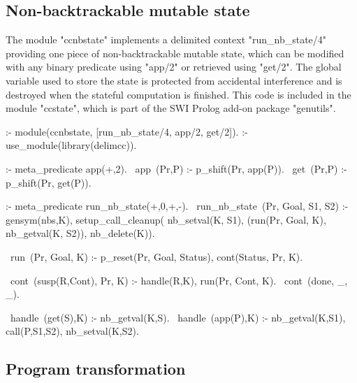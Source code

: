 
\subsection{Non-backtrackable mutable state}
\label{app:ccnbstate}

The module "ccnbstate" implements a delimited context "run_nb_state/4"
providing one piece of non-backtrackable mutable state, which can be modified with any binary predicate
using "app/2" or retrieved using "get/2". The global variable used to store the state
is protected from accidental interference and is destroyed when the stateful
computation is finished. This code is included in the module "ccstate", which 
is part of the SWI Prolog add-on package "genutils".
\begin{prolog-framed}[name=ccnbstate]
  :- module(ccnbstate, [run_nb_state/4, app/2, get/2]).
  :- use_module(library(delimcc)).

  :- meta_predicate app(+,2).
  ~app~(Pr,P) :- p_shift(Pr, app(P)).
  ~get~(Pr,P) :- p_shift(Pr, get(P)).

  :- meta_predicate run_nb_state(+,0,+,-).
  ~run_nb_state~(Pr, Goal, S1, S2) :-
     gensym(nbs,K),
     setup_call_cleanup( nb_setval(K, S1),
                         (run(Pr, Goal, K), nb_getval(K, S2)),
                         nb_delete(K)).

  ~run~(Pr, Goal, K) :- p_reset(Pr, Goal, Status), cont(Status, Pr, K).

  ~cont~(susp(R,Cont), Pr, K) :- handle(R,K), run(Pr, Cont, K).
  ~cont~(done, _, _).

  ~handle~(get(S),K) :- nb_getval(K,S).
  ~handle~(app(P),K) :- nb_getval(K,S1), call(P,S1,S2), nb_setval(K,S2).
\end{prolog-framed}

\subsection{Program transformation}
\label{sec:ccmacros}

